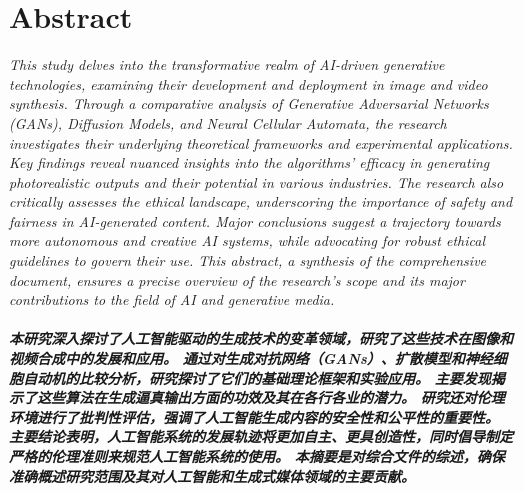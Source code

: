 \documentclass[11pt,a4paper,oneside]{report}
\newcommand{\instructions}[1]{{\color{black}\itshape #1}}
\begin{document}

\clearpage
{}


\setcounter{tocdepth}{1} %
\tableofcontents


\chapter*{Abstract}


\instructions{This study delves into the transformative realm of AI-driven generative technologies, 
examining their development and deployment in image and video synthesis. 
Through a comparative analysis of Generative Adversarial Networks (GANs), 
Diffusion Models, and Neural Cellular Automata, the research investigates their underlying theoretical frameworks and experimental applications. 
Key findings reveal nuanced insights into the algorithms' efficacy in generating photorealistic outputs and their potential in various industries. 
The research also critically assesses the ethical landscape, underscoring the importance of safety and fairness in AI-generated content. 
Major conclusions suggest a trajectory towards more autonomous and creative AI systems, while advocating for robust ethical guidelines to govern their use. 
This abstract, a synthesis of the comprehensive document, ensures a precise overview of the research's scope and its major contributions to the field of AI and generative media.}

\vspace{4\bigskipamount}


\paragraph{\textnormal{本研究深入探讨了人工智能驱动的生成技术的变革领域，研究了这些技术在图像和视频合成中的发展和应用。
通过对生成对抗网络（GANs）、扩散模型和神经细胞自动机的比较分析，研究探讨了它们的基础理论框架和实验应用。
主要发现揭示了这些算法在生成逼真输出方面的功效及其在各行各业的潜力。
研究还对伦理环境进行了批判性评估，强调了人工智能生成内容的安全性和公平性的重要性。
主要结论表明，人工智能系统的发展轨迹将更加自主、更具创造性，同时倡导制定严格的伦理准则来规范人工智能系统的使用。
本摘要是对综合文件的综述，确保准确概述研究范围及其对人工智能和生成式媒体领域的主要贡献。}}
\end{document}
